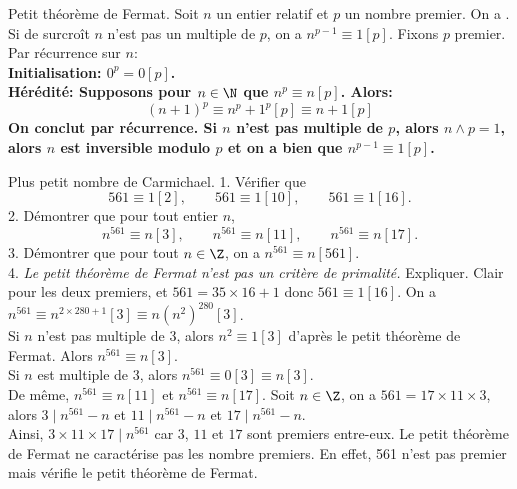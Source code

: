 \documentclass[11pt]{article}
\begin{document}
\begin{thm}{Petit théorème de Fermat.}{}
    Soit $n$ un entier relatif et $p$ un nombre premier. On a .\n
    Si de surcroît $n$ n'est pas un multiple de $p$, on a $n^{p-1}\equiv1[p]$.
    \tcblower
    Fixons $p$ premier. Par récurrence sur $n$:\\
    \bf{Initialisation:} $0^p=0[p]$.\\
    \bf{Hérédité:} Supposons pour $n\in\N$ que $n^p\equiv n[p]$. Alors:
    \begin{equation*}
        (n+1)^p\equiv n^p + 1^p [p] \equiv n+1[p]
    \end{equation*}
    On conclut par récurrence.\n
    Si $n$ n'est pas multiple de $p$, alors $n\land p=1$, alors $n$ est inversible modulo $p$ et on a bien que $n^{p-1}\equiv 1[p]$.
\end{thm}

\begin{ex}{Plus petit nombre de Carmichael.}{}
    1. Vérifier que
    \begin{equation*}
        561\equiv 1[2], \qquad 561\equiv1[10], \qquad 561\equiv 1[16].
    \end{equation*}
    2. Démontrer que pour tout entier $n$,
    \begin{equation*}
        n^{561}\equiv n[3], \qquad n^{561}\equiv n[11], \qquad n^{561}\equiv n[17].
    \end{equation*}
    3. Démontrer que pour tout $n\in\Z$, on a $n^{561}\equiv n[561]$.\\
    4. \emph{Le petit théorème de Fermat n'est pas un critère de primalité.} Expliquer.
    \tcblower
     Clair pour les deux premiers, et $561=35\times16+1$ donc $561\equiv1[16]$.\n
     On a $n^{561}\equiv n^{2\times280+1}[3]\equiv n(n^2)^{280}[3]$.\\
    Si $n$ n'est pas multiple de 3, alors $n^{2}\equiv 1[3]$ d'après le petit théorème de Fermat. Alors $n^{561}\equiv n[3]$.\\
    Si $n$ est multiple de 3, alors $n^{561}\equiv0[3]\equiv n[3]$.\\
    De même, $n^{561}\equiv n[11]$ et $n^{561}\equiv n[17]$.\n
     Soit $n\in\Z$, on a $561=17\times11\times3$, alors $3\mid n^{561}-n$ et $11\mid n^{561}-n$ et $17\mid n^{561}-n$.\\
    Ainsi, $3\times11\times17\mid n^{561}$ car $3$, $11$ et $17$ sont premiers entre-eux.\n
     Le petit théorème de Fermat ne caractérise pas les nombre premiers. En effet, 561 n'est pas premier mais vérifie le petit théorème de Fermat.
\end{ex}
\end{document}
